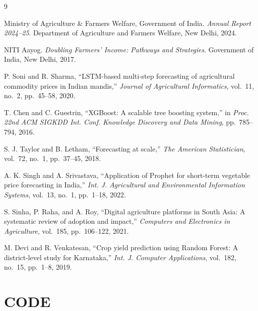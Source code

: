 \documentclass[12pt,a4paper]{report}
\begin{document}
\begin{thebibliography}{9}

Ministry of Agriculture \& Farmers Welfare, Government of India.
\textit{Annual Report 2024--25}.
Department of Agriculture and Farmers Welfare, New Delhi, 2024.

NITI Aayog.
\textit{Doubling Farmers' Income: Pathways and Strategies}.
Government of India, New Delhi, 2017.

P. Soni and R. Sharma,
``LSTM-based multi-step forecasting of agricultural commodity prices in Indian mandis,''
\textit{Journal of Agricultural Informatics}, vol.~11, no.~2, pp.~45--58, 2020.

T. Chen and C. Guestrin,
``XGBoost: A scalable tree boosting system,''
in \textit{Proc. 22nd ACM SIGKDD Int. Conf. Knowledge Discovery and Data Mining},
pp.~785--794, 2016.

S. J. Taylor and B. Letham,
``Forecasting at scale,''
\textit{The American Statistician}, vol.~72, no.~1, pp.~37--45, 2018.

A. K. Singh and A. Srivastava,
``Application of Prophet for short-term vegetable price forecasting in India,''
\textit{Int. J. Agricultural and Environmental Information Systems}, vol.~13, no.~1,
pp.~1--18, 2022.

S. Sinha, P. Raha, and A. Roy,
``Digital agriculture platforms in South Asia: A systematic review of adoption and impact,''
\textit{Computers and Electronics in Agriculture}, vol.~185, pp.~106--122, 2021.

M. Devi and R. Venkatesan,
``Crop yield prediction using Random Forest: A district-level study for Karnataka,''
\textit{Int. J. Computer Applications}, vol.~182, no.~15, pp.~1--8, 2019.

\end{thebibliography}

\appendix

\chapter{CODE}
\end{document}
